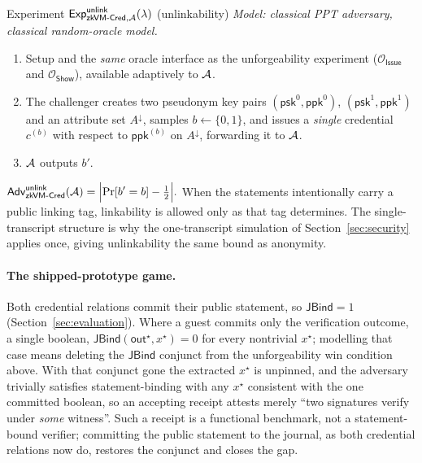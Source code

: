 \begin{gamebox}{Experiment $\mathsf{Exp}^{\mathsf{unlink}}_{\mathsf{zkVM\text{-}Cred},\mathcal{A}}(\lambda)$ (unlinkability)}
    \emph{Model: classical PPT adversary, classical random-oracle model.}\par\smallskip
    \begin{enumerate}
        \item Setup and the \emph{same} oracle interface as the unforgeability experiment ($\mathcal O_{\mathsf{Issue}}$ and $\mathcal O_{\mathsf{Show}}$), available adaptively to $\mathcal{A}$.
        \item The challenger creates two pseudonym key pairs $(\mathsf{psk}^0,\mathsf{ppk}^0)$, $(\mathsf{psk}^1,\mathsf{ppk}^1)$ and an attribute set $A^\downarrow$, samples $b\leftarrow\{0,1\}$, and issues a \emph{single} credential $c^{(b)}$ with respect to $\mathsf{ppk}^{(b)}$ on $A^\downarrow$, forwarding it to $\mathcal{A}$.
        \item $\mathcal{A}$ outputs $b'$.
    \end{enumerate}
    $\displaystyle
    \mathsf{Adv}^{\mathsf{unlink}}_{\mathsf{zkVM\text{-}Cred}}(\mathcal{A})=\Bigl|\Pr[b'=b]-\tfrac12\Bigr|.$ When the statements intentionally carry a public linking tag, linkability is allowed only as that tag determines. The single-transcript structure is why the one-transcript simulation of Section~\ref{sec:security} applies once, giving unlinkability the same bound as anonymity.
\end{gamebox}

\paragraph{The shipped-prototype game.}
Both credential relations commit their public statement, so $\mathsf{JBind}=1$ (Section~\ref{sec:evaluation}). Where a guest commits only the verification outcome, a single boolean, $\mathsf{JBind}(\mathsf{out}^\star,x^\star)=0$ for every nontrivial $x^\star$; modelling that case means deleting the $\mathsf{JBind}$ conjunct from the unforgeability win condition above. With that conjunct gone the extracted $x^\star$ is unpinned, and the adversary trivially satisfies statement-binding with any $x^\star$ consistent with the one committed boolean, so an accepting receipt attests merely ``two signatures verify under \emph{some} witness''. Such a receipt is a functional benchmark, not a statement-bound verifier; committing the public statement to the journal, as both credential relations now do, restores the conjunct and closes the gap.

